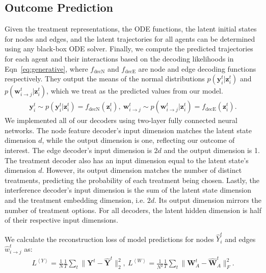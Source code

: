 \subsection{Outcome Prediction}
Given the treatment representations, the ODE functions, the latent initial states for nodes and edges,  and the latent trajectories for all agents can be determined using any black-box ODE solver.
 Finally, we compute the predicted trajectories for each agent and their interactions based on the decoding likelihoods in Eqn~\eqref{eq:generative}, where $f_{\text{decN}}$ and $f_{\text{decE}}$ are node and edge decoding functions respectively. They output the means of the normal distributions $ p(\bm{y}_{i}^{t} | \bm{z}_{i}^{t})$ and $p(\bm{w}_{i\rightarrow j}^{t} | \bm{z}_{i}^{t})$, which we treat as the predicted values from our model.
\begin{equation}
\begin{aligned}
     \bm{y}_i^{t} \sim p(\bm{y}_{i}^{t} | \bm{z}_{i}^{t}) = f_{\text{decN}}(\bm{z}_{i}^{t}),~\bm{w}_{i\rightarrow j}^{t} \sim p(\bm{w}_{i\rightarrow j}^{t} | \bm{z}_{i}^{t}) = f_{\text{decE}}(\bm{z}_{i}^{t}).
\end{aligned}
    \label{eq:generative}
\end{equation}
We implemented all of our decoders using two-layer fully connected neural networks. The node feature decoder's input dimension matches the latent state dimension $d$, while the output dimension is one, reflecting our outcome of interest. The edge decoder's input dimension is $2d$ and the output dimension is 1. The treatment decoder also has an input dimension equal to the latent state's dimension $d$. However, its output dimension matches the number of distinct treatments, predicting the probability of each treatment being chosen. Lastly, the interference decoder's input dimension is the sum of the latent state dimension and the treatment embedding dimension, i.e. $2d$. Its output dimension mirrors the number of treatment options. For all decoders, the latent hidden dimension is half of their respective input dimensions.

We calculate the reconstruction loss of model predictions for nodes $\hat Y_i^t$ and edges $ \hat w_{i\rightarrow j}^t $ as: 
\begin{align*}
    L^{\left< Y \right>} = \frac{1}{N}\frac{1}{T} \sum_t \|\mathbf{Y}^t - \hat{\mathbf{Y}}^t\|^2_2,~
    L^{\left< W \right>} = \frac{1}{N^2}\frac{1}{T}  \sum_t \|\mathbf{W}_{A}^t - \hat{\mathbf{W}}_{A}^t\|^2_F.
\end{align*}

